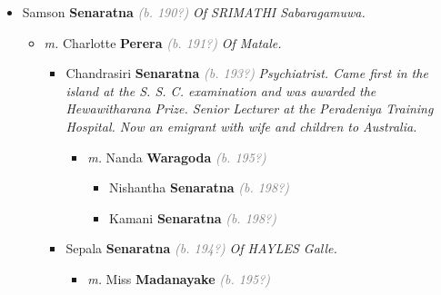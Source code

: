 \documentclass[10pt, openany]{book}
\begin{document}
\begin{itemize}
{\begin{itemize}
{\begin{itemize}
{\begin{itemize}
{\begin{itemize}
{\begin{itemize}
{ }
\item{Mignonne \textbf{Senaratna} \textcolor{gray}{\textit{(b. 198?)}} \textcolor{slmaroon}{\textit{In the U. K.}}
 }
\item{Lalith \textbf{Senaratna} \textcolor{gray}{\textit{(b. 198?)}} \textcolor{slmaroon}{\textit{In the U. K.}}
 }
\end{itemize}}
\end{itemize}
 }
\end{itemize}}
\end{itemize}
 }
\item{Samson \textbf{Senaratna} \textcolor{gray}{\textit{(b. 190?)}} \textcolor{slmaroon}{\textit{Of SRIMATHI Sabaragamuwa.}}
\begin{itemize}
\item{\textit{m.} Charlotte \textbf{Perera} \textcolor{gray}{\textit{(b. 191?)}} \textcolor{slmaroon}{\textit{Of Matale.}}   \label{couple:00000594:00000773} \begin{itemize}
\item{Chandrasiri \textbf{Senaratna} \textcolor{gray}{\textit{(b. 193?)}} \textcolor{slmaroon}{\textit{Psychiatrist.
Came first in the island at the S. S. C. examination and was awarded the Hewawitharana Prize. Senior Lecturer at the Peradeniya Training Hospital. Now an emigrant with wife and children to Australia.}}
\begin{itemize}
\item{\textit{m.} Nanda \textbf{Waragoda} \textcolor{gray}{\textit{(b. 195?)}}   \label{couple:00000716:00000918} \begin{itemize}
\item{Nishantha \textbf{Senaratna} \textcolor{gray}{\textit{(b. 198?)}}
 }
\item{Kamani \textbf{Senaratna} \textcolor{gray}{\textit{(b. 198?)}}
 }
\end{itemize}}
\end{itemize}
 }
\item{Sepala \textbf{Senaratna} \textcolor{gray}{\textit{(b. 194?)}} \textcolor{slmaroon}{\textit{Of HAYLES Galle.}}
\begin{itemize}
\item{\textit{m.} Miss \textbf{Madanayake} \textcolor{gray}{\textit{(b. 195?)}}   \label{couple:00000517:00000774} \begin{itemize}

\end{itemize}}
\end{itemize}}
\end{itemize}}
\end{itemize}}
\end{itemize}}
\end{itemize}
\end{document}
